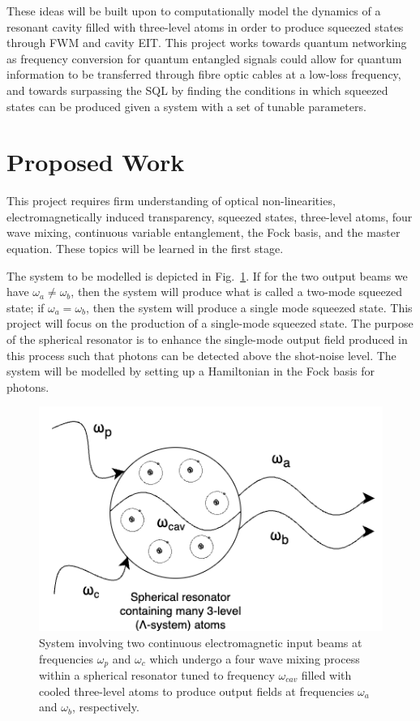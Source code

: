 \documentclass[aps,pra,showpacs,amsmath,amssymb,nofootinbib,longbibliography,superscriptaddress
]{revtex4-1}
\theoremstyle{definition}
\theoremstyle{remark}
\newcommand{\0}{\hat{0}}
\begin{document}
These ideas will be built upon to computationally model the dynamics of a resonant cavity filled with three-level atoms in order to produce squeezed states through FWM and cavity EIT. This project works towards quantum networking as frequency conversion for quantum entangled signals could allow for quantum information to be transferred through fibre optic cables at a low-loss frequency, and towards surpassing the SQL by finding the conditions in which squeezed states can be produced given a system with a set of tunable parameters.

\section{Proposed Work}

This project requires firm understanding of optical non-linearities, electromagnetically induced transparency, squeezed states, three-level atoms, four wave mixing, continuous variable entanglement, the Fock basis, and the master equation. These topics will be learned in the first stage.

The system to be modelled is depicted in Fig.~\ref{SphericalResonator}. If for the two output beams we have $\omega_a \neq \omega_b$, then the system will produce what is called a two-mode squeezed state; if $\omega_a = \omega_b$, then the system will produce a single mode squeezed state. This project will focus on the production of a single-mode squeezed state. The purpose of the spherical resonator is to enhance the single-mode output field produced in this process such that photons can be detected above the shot-noise level. The system will be modelled by setting up a Hamiltonian in the Fock basis for photons.

\begin{figure}[h!]
    \includegraphics[width=0.5\columnwidth]{SphericalResonator.png}
    \caption{System involving two continuous electromagnetic input beams at frequencies $\omega_p$ and $\omega_c$ which undergo a four wave mixing process within a spherical resonator tuned to frequency $\omega_{cav}$ filled with cooled three-level atoms to produce output fields at frequencies $\omega_a$ and $\omega_{b}$, respectively.}
    \label{SphericalResonator}
\end{figure}
\end{document}
